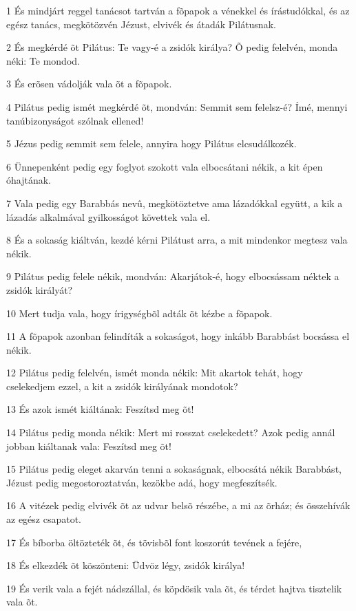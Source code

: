 \par 1 És mindjárt reggel tanácsot tartván a fõpapok a vénekkel és írástudókkal, és az egész tanács, megkötözvén Jézust, elvivék és átadák Pilátusnak.
\par 2 És megkérdé õt Pilátus: Te vagy-é a zsidók királya? Õ pedig felelvén, monda néki: Te mondod.
\par 3 És erõsen vádolják vala õt a fõpapok.
\par 4 Pilátus pedig ismét megkérdé õt, mondván: Semmit sem felelsz-é? Ímé, mennyi tanúbizonyságot szólnak ellened!
\par 5 Jézus pedig semmit sem felele, annyira hogy Pilátus elcsudálkozék.
\par 6 Ünnepenként pedig egy foglyot szokott vala elbocsátani nékik, a kit épen óhajtának.
\par 7 Vala pedig egy Barabbás nevû, megkötöztetve ama lázadókkal együtt, a kik a lázadás alkalmával gyilkosságot követtek vala el.
\par 8 És a sokaság kiáltván, kezdé kérni Pilátust arra, a mit mindenkor megtesz vala nékik.
\par 9 Pilátus pedig felele nékik, mondván: Akarjátok-é, hogy elbocsássam néktek a zsidók királyát?
\par 10 Mert tudja vala, hogy írigységbõl adták õt kézbe a fõpapok.
\par 11 A fõpapok azonban felindíták a sokaságot, hogy inkább Barabbást bocsássa el nékik.
\par 12 Pilátus pedig felelvén, ismét monda nékik: Mit akartok tehát, hogy cselekedjem ezzel, a kit a zsidók királyának mondotok?
\par 13 És azok ismét kiáltának: Feszítsd meg õt!
\par 14 Pilátus pedig monda nékik: Mert mi rosszat cselekedett? Azok pedig annál jobban kiáltanak vala: Feszítsd meg õt!
\par 15 Pilátus pedig eleget akarván tenni a sokaságnak, elbocsátá nékik Barabbást, Jézust pedig megostoroztatván, kezökbe adá, hogy megfeszítsék.
\par 16 A vitézek pedig elvivék õt az udvar belsõ részébe, a mi az õrház; és összehívák az egész csapatot.
\par 17 És bíborba öltözteték õt, és tövisbõl font koszorút tevének a fejére,
\par 18 És elkezdék õt köszönteni: Üdvöz légy, zsidók királya!
\par 19 És verik vala a fejét nádszállal, és köpdösik vala õt, és térdet hajtva tisztelik vala õt.
